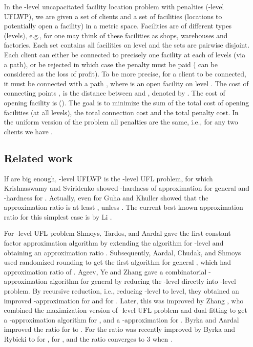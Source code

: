\documentclass{llncs}
\begin{document}
In the -level uncapacitated facility location problem with penalties (-level UFLWP), we are given a set  of clients and a set  of facilities (locations to potentially open a facility) in a metric space. Facilities are of  different types (levels), e.g., for  one may think of these facilities as shops, warehouses and factories.
Each set  contains all facilities on level  and the sets  are pairwise disjoint.
Each client  can either be connected to precisely one facility at each of  levels (via a path), or be rejected in which case the penalty  must be paid ( can be considered as the loss of profit).
To be more precise, for a client  to be connected, it must be connected with a path , where  is an open facility on level .
The cost of connecting points , is the distance between  and , denoted by . The cost of opening facility  is  ().
The goal is to minimize the sum of the total cost of opening facilities (at all levels), the total connection cost and the total penalty cost.
In the uniform version of the problem all penalties are the same, i.e., for any two clients  we have .

\subsection{Related work}

If  are big enough, -level UFLWP is the -level UFL problem, for which Krishnaswamy and Sviridenko \cite{Krishnaswamy} showed
-hardness of approximation for general  and -hardness for . Actually, even for  Guha and Khuller \cite{Guha} showed that the approximation ratio is at least , unless . The current best known approximation ratio for this simplest case  is  by Li \cite{ShiLi}.

For -level UFL problem Shmoys, Tardos, and Aardal \cite{shmoys_stoc97} gave the first constant factor approximation algorithm by extending the algorithm for -level and obtaining an approximation ratio . Subsequently, Aardal, Chudak, and Shmoys \cite{Aardal} used randomized rounding to get the first algorithm for general , which had approximation ratio of .
Ageev, Ye and Zhang \cite{Ageev} gave a combinatorial -approximation algorithm for general  by reducing the -level directly into -level problem. By recursive reduction, i.e., reducing -level to  level, they obtained an improved -approximation for  and  for . Later, this was improved by Zhang \cite{Zhang}, who combined the maximization version of -level UFL problem and dual-fitting to get a -approximation algorithm for , and a -approximation for .
Byrka and Aardal \cite{Byrka} improved the ratio for  to .
For  the ratio was recently improved by Byrka and Rybicki \cite{Rybicki} to  for ,  for , and the ratio converges to 3 when .
\end{document}
